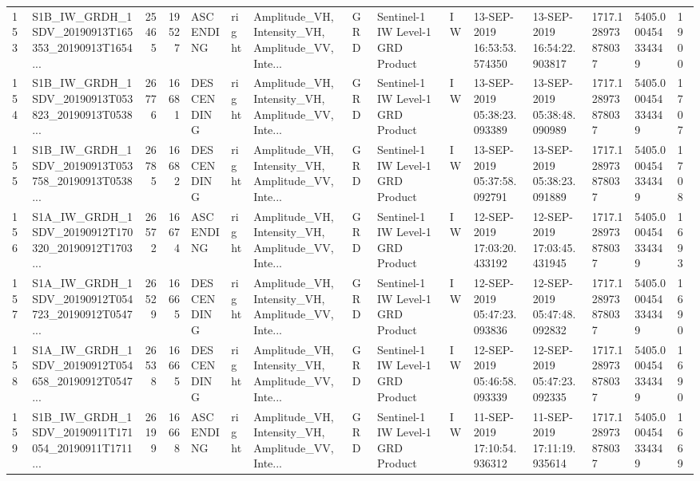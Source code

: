 \begin{tabular}{llrrlllllllllll}
153 &  S1B\_IW\_GRDH\_1SDV\_20190913T165353\_20190913T1654... &  25465 &   19527 &   ASCENDING &  right &  Amplitude\_VH, Intensity\_VH, Amplitude\_VV, Inte... &          GRD &  Sentinel-1 IW Level-1 GRD Product &              IW &  13-SEP-2019 16:53:53.574350 &  13-SEP-2019 16:54:22.903817 &          1717.128973878037 &  5405.000454334349 &       1900 \\
154 &  S1B\_IW\_GRDH\_1SDV\_20190913T053823\_20190913T0538... &  26776 &   16681 &  DESCENDING &  right &  Amplitude\_VH, Intensity\_VH, Amplitude\_VV, Inte... &          GRD &  Sentinel-1 IW Level-1 GRD Product &              IW &  13-SEP-2019 05:38:23.093389 &  13-SEP-2019 05:38:48.090989 &          1717.128973878037 &  5405.000454334349 &       1707 \\
155 &  S1B\_IW\_GRDH\_1SDV\_20190913T053758\_20190913T0538... &  26785 &   16682 &  DESCENDING &  right &  Amplitude\_VH, Intensity\_VH, Amplitude\_VV, Inte... &          GRD &  Sentinel-1 IW Level-1 GRD Product &              IW &  13-SEP-2019 05:37:58.092791 &  13-SEP-2019 05:38:23.091889 &          1717.128973878037 &  5405.000454334349 &       1708 \\
156 &  S1A\_IW\_GRDH\_1SDV\_20190912T170320\_20190912T1703... &  26572 &   16674 &   ASCENDING &  right &  Amplitude\_VH, Intensity\_VH, Amplitude\_VV, Inte... &          GRD &  Sentinel-1 IW Level-1 GRD Product &              IW &  12-SEP-2019 17:03:20.433192 &  12-SEP-2019 17:03:45.431945 &          1717.128973878037 &  5405.000454334349 &       1693 \\
157 &  S1A\_IW\_GRDH\_1SDV\_20190912T054723\_20190912T0547... &  26529 &   16665 &  DESCENDING &  right &  Amplitude\_VH, Intensity\_VH, Amplitude\_VV, Inte... &          GRD &  Sentinel-1 IW Level-1 GRD Product &              IW &  12-SEP-2019 05:47:23.093836 &  12-SEP-2019 05:47:48.092832 &          1717.128973878037 &  5405.000454334349 &       1690 \\
158 &  S1A\_IW\_GRDH\_1SDV\_20190912T054658\_20190912T0547... &  26538 &   16665 &  DESCENDING &  right &  Amplitude\_VH, Intensity\_VH, Amplitude\_VV, Inte... &          GRD &  Sentinel-1 IW Level-1 GRD Product &              IW &  12-SEP-2019 05:46:58.093339 &  12-SEP-2019 05:47:23.092335 &          1717.128973878037 &  5405.000454334349 &       1690 \\
159 &  S1B\_IW\_GRDH\_1SDV\_20190911T171054\_20190911T1711... &  26199 &   16668 &   ASCENDING &  right &  Amplitude\_VH, Intensity\_VH, Amplitude\_VV, Inte... &          GRD &  Sentinel-1 IW Level-1 GRD Product &              IW &  11-SEP-2019 17:10:54.936312 &  11-SEP-2019 17:11:19.935614 &          1717.128973878037 &  5405.000454334349 &       1669 \\

\end{tabular}
